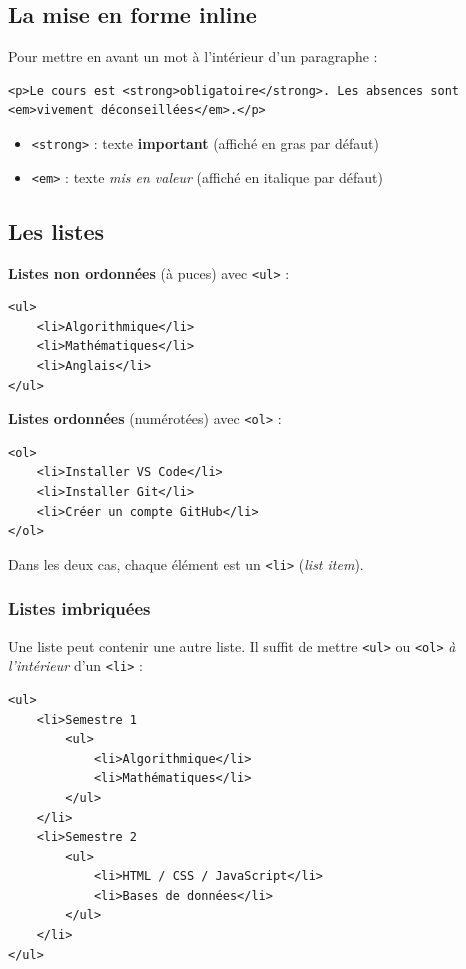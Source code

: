 \documentclass[11pt,a4paper]{article}
\begin{document}
\subsection{La mise en forme inline}

Pour mettre en avant un mot à l'intérieur d'un paragraphe :

\begin{lstlisting}[language=HTML5]
<p>Le cours est <strong>obligatoire</strong>. Les absences sont <em>vivement déconseillées</em>.</p>
\end{lstlisting}

\begin{itemize}[nosep]
    \item \texttt{<strong>} : texte \textbf{important} (affiché en gras par défaut)
    \item \texttt{<em>} : texte \emph{mis en valeur} (affiché en italique par défaut)
\end{itemize}

\subsection{Les listes}

\textbf{Listes non ordonnées} (à puces) avec \texttt{<ul>} :

\begin{lstlisting}[language=HTML5]
<ul>
    <li>Algorithmique</li>
    <li>Mathématiques</li>
    <li>Anglais</li>
</ul>
\end{lstlisting}

\textbf{Listes ordonnées} (numérotées) avec \texttt{<ol>} :

\begin{lstlisting}[language=HTML5]
<ol>
    <li>Installer VS Code</li>
    <li>Installer Git</li>
    <li>Créer un compte GitHub</li>
</ol>
\end{lstlisting}

Dans les deux cas, chaque élément est un \texttt{<li>} (\emph{list item}).

\subsubsection*{Listes imbriquées}

Une liste peut contenir une autre liste. Il suffit de mettre \texttt{<ul>}
ou \texttt{<ol>} \emph{à l'intérieur} d'un \texttt{<li>} :

\begin{lstlisting}[language=HTML5]
<ul>
    <li>Semestre 1
        <ul>
            <li>Algorithmique</li>
            <li>Mathématiques</li>
        </ul>
    </li>
    <li>Semestre 2
        <ul>
            <li>HTML / CSS / JavaScript</li>
            <li>Bases de données</li>
        </ul>
    </li>
</ul>
\end{lstlisting}
\end{document}
